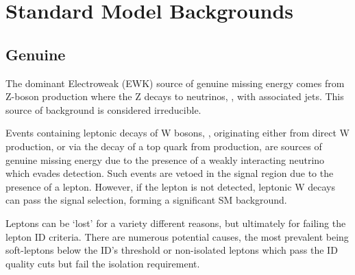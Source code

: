 
\section{Standard Model Backgrounds}
\subsection{Genuine \met}
The dominant Electroweak (EWK) source of genuine missing energy comes from
Z-boson production where the Z decays
to neutrinos, \zinv, with associated jets. This source of background
is considered irreducible.

Events containing leptonic decays of W bosons, \wlnu, originating either
from direct W production, or via the decay of a top quark from \ttbar 
production, are sources of genuine 
missing energy due to the presence of a weakly interacting neutrino which
evades detection. Such events are vetoed in the signal
region due to the presence of a 
lepton. However, if the lepton is not detected, leptonic W decays 
can pass the signal selection, forming a significant SM background.


Leptons can be `lost' for a variety different reasons, but ultimately for failing
the lepton ID criteria. There are numerous potential causes, the 
most prevalent being soft-leptons below the ID's \Pt threshold or non-isolated
leptons
which pass the ID quality cuts but fail the isolation requirement.




